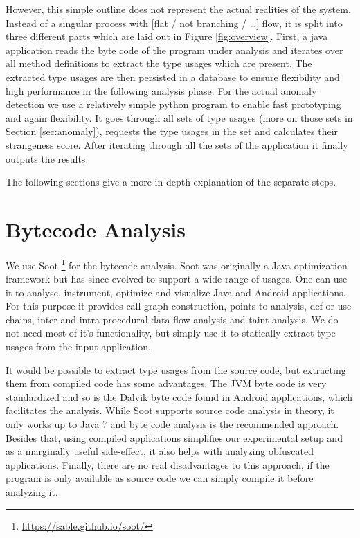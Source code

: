 However, this simple outline does not represent the actual realities of the system.
Instead of a singular process with [flat / not branching / \ldots] flow, it is split into three different parts which are laid out in Figure \ref{fig:overview}.
First, a java application reads the byte code of the program under analysis and iterates over all method definitions to extract the type usages which are present.
The extracted type usages are then persisted in a database to ensure flexibility and high performance in the following analysis phase.
For the actual anomaly detection we use a relatively simple python program to enable fast prototyping and again flexibility.
It goes through all sets of type usages (more on those sets in Section \ref{sec:anomaly}), requests the type usages in the set and calculates their strangeness score.
After iterating through all the sets of the application it finally outputs the results.

The following sections give a more in depth explanation of the separate steps.

\section{Bytecode Analysis}\label{sec:bytecode}

We use Soot \footnote{\url{https://sable.github.io/soot/}} for the bytecode analysis.
Soot was originally a Java optimization framework but has since evolved to support a wide range of usages.
One can use it to analyse, instrument, optimize and visualize Java and Android applications.
For this purpose it provides call graph construction, points-to analysis, def or use chains, inter and intra-procedural data-flow analysis and taint analysis.
We do not need most of it's functionality, but simply use it to statically extract type usages from the input application.

It would be possible to extract type usages from the source code, but extracting them from compiled code has some advantages.
The JVM byte code is very standardized and so is the Dalvik byte code found in Android applications, which facilitates the analysis.
While Soot supports source code analysis in theory, it only works up to Java 7 and byte code analysis is the recommended approach.
Besides that, using compiled applications simplifies our experimental setup and as a marginally useful side-effect, it also helps with analyzing obfuscated applications.
Finally, there are no real disadvantages to this approach, if the program is only available as source code we can simply compile it before analyzing it.

